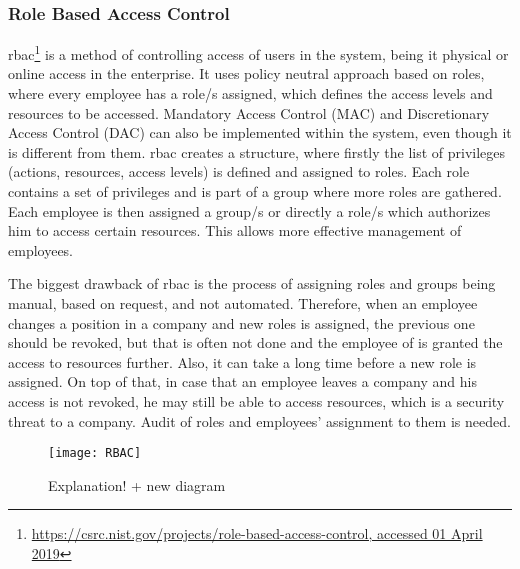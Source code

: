 \subsubsection{Role Based Access Control} \label{RBAC_SOTA}

\acrfull{rbac}\footnote{\url{https://csrc.nist.gov/projects/role-based-access-control, accessed 01 April 2019}} is a method of controlling access of users in the system, being it physical or online access in the enterprise. It uses policy neutral approach based on roles, where every employee has a role/s assigned, which defines the access levels and resources to be accessed. Mandatory Access Control (MAC) and Discretionary Access Control (DAC) can also be implemented within the system, even though it is different from them. \acrshort{rbac} creates a structure, where firstly the list of privileges (actions, resources, access levels) is defined and assigned to roles. Each role contains a set of privileges and is part of a group where more roles are gathered. Each employee is then assigned a group/s or directly a role/s which authorizes him to access certain resources. This allows more effective management of employees.

The biggest drawback of \acrshort{rbac} is the process of assigning roles and groups being manual, based on request, and not automated. Therefore, when an employee changes a position in a company and new roles is assigned, the previous one should be revoked, but that is often not done and the employee of is granted the access to resources further. Also, it can take a long time before a new role is assigned. On top of that, in case that an employee leaves a company and his access is not revoked, he may still be able to access resources, which is a security threat to a company. Audit of roles and employees’ assignment to them is needed.

\begin{figure}[ht]
    \centering
    \texttt{[image: RBAC]}
    \caption{Explanation! + new diagram}
    \label{fig:RBAC_diagram_sota}
\end{figure}